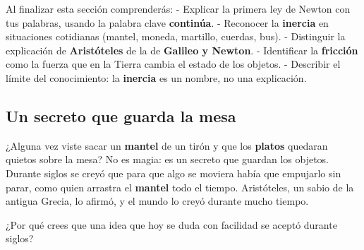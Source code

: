 \documentclass[
  spanish,
  letterpaper,
  12pt,
  oneside,
  open=any,
  DIV=15]{scrbook}
\begin{document}
\begin{tcolorbox}[enhanced jigsaw, arc=.35mm, bottomrule=.15mm, bottomtitle=1mm, breakable, colback=white, colbacktitle=quarto-callout-important-color!10!white, colframe=quarto-callout-important-color-frame, coltitle=black, left=2mm, leftrule=.75mm, opacityback=0, opacitybacktitle=0.6, rightrule=.15mm, title=\textcolor{quarto-callout-important-color}{\faExclamation}\hspace{0.5em}{Conceptos Clave (Objetivos de Aprendizaje)}, titlerule=0mm, toprule=.15mm, toptitle=1mm]

Al finalizar esta sección comprenderás: - Explicar la primera ley de
Newton con tus palabras, usando la palabra clave \textbf{continúa}. -
Reconocer la \textbf{inercia} en situaciones cotidianas (mantel, moneda,
martillo, cuerdas, bus). - Distinguir la explicación de
\textbf{Aristóteles} de la de \textbf{Galileo y Newton}. - Identificar
la \textbf{fricción} como la fuerza que en la Tierra cambia el estado de
los objetos. - Describir el límite del conocimiento: la \textbf{inercia}
es un nombre, no una explicación.

\end{tcolorbox}

\subsection{Un secreto que guarda la
mesa}\label{un-secreto-que-guarda-la-mesa}

¿Alguna vez viste sacar un \textcolor[HTML]{2563EB}{\textbf{mantel}} de
un tirón y que los \textcolor[HTML]{7C3AED}{\textbf{platos}} quedaran
quietos sobre la mesa? No es magia: es un secreto que guardan los
objetos. Durante siglos se creyó que para que algo se moviera había que
empujarlo sin parar, como quien arrastra el
\textcolor[HTML]{2563EB}{\textbf{mantel}} todo el tiempo. Aristóteles,
un sabio de la antigua Grecia, lo afirmó, y el mundo lo creyó durante
mucho tiempo.

\begin{tcolorbox}[enhanced jigsaw, arc=.35mm, bottomrule=.15mm, bottomtitle=1mm, breakable, colback=white, colbacktitle=quarto-callout-warning-color!10!white, colframe=quarto-callout-warning-color-frame, coltitle=black, left=2mm, leftrule=.75mm, opacityback=0, opacitybacktitle=0.6, rightrule=.15mm, title=\textcolor{quarto-callout-warning-color}{\faExclamationTriangle}\hspace{0.5em}{Pregunta de comprensión}, titlerule=0mm, toprule=.15mm, toptitle=1mm]

¿Por qué crees que una idea que hoy se duda con facilidad se aceptó
durante siglos?

\end{tcolorbox}
\end{document}
